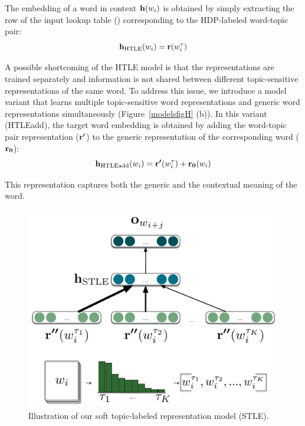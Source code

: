 The embedding of a word in context $\bm{\mathbf{h}}({w_i})$ is obtained by simply extracting the row of the input lookup table () corresponding to the HDP-labeled word-topic pair:
\begin{equation}\label{eq:HTLE}
\bm{\mathbf{h}}_\textrm{HTLE}({w_i}) = \bm{\mathbf{r}}(w_i^{\tau})
\end{equation}

A possible shortcoming of the HTLE model is that the representations are trained separately and information is not shared between different topic-sensitive representations of the same word. 
To address this issue, we introduce a model variant that learns multiple topic-sensitive word representations and generic word representations simultaneously (Figure~\ref{modelsfigH} (b)). 
In this variant (HTLEadd), the target word embedding is obtained by adding the word-topic pair representation ($\bm{\mathbf{r'}}$) to the generic representation of the corresponding word ($\bm{\mathbf{r_0}}$):
\begin{equation}\label{eq:HTLEadd}
\bm{\mathbf{h}}_\textrm{HTLEadd}({w_i}) = \bm{\mathbf{r'}}(w_i^\tau) + \bm{\mathbf{r_0}}(w_i)
\end{equation}

This representation captures both the generic and the contextual meaning of the word.

\begin{figure}[hbt!]
\centering
\includegraphics[scale=0.2]{03-research-01/figs/fig3.pdf}
\caption{Illustration of our soft topic-labeled representation model (STLE). \label{modelsfigS}}
\end{figure}

